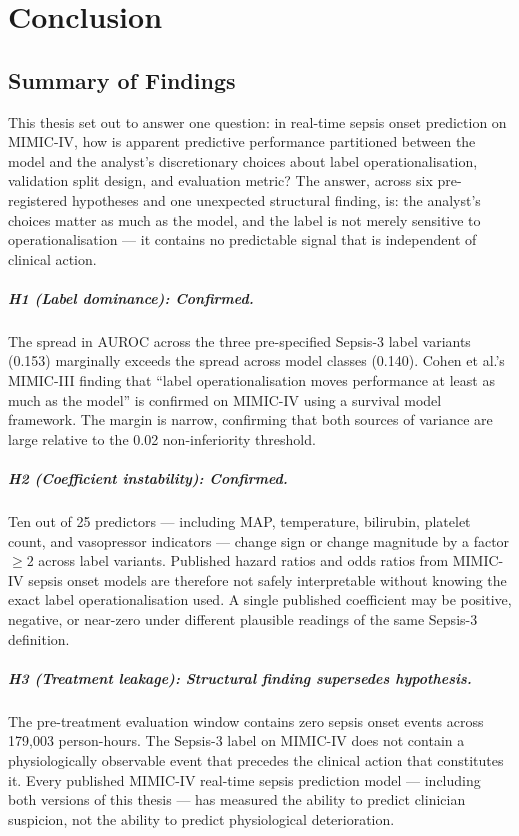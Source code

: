 \chapter{Conclusion}
\label{ch:conclusion}

\section{Summary of Findings}

This thesis set out to answer one question: in real-time sepsis onset prediction
on MIMIC-IV, how is apparent predictive performance partitioned between the model
and the analyst's discretionary choices about label operationalisation, validation
split design, and evaluation metric? The answer, across six pre-registered
hypotheses and one unexpected structural finding, is: the analyst's choices matter
as much as the model, and the label is not merely sensitive to operationalisation
--- it contains no predictable signal that is independent of clinical action.

\paragraph{H1 (Label dominance): Confirmed.}
The spread in AUROC across the three pre-specified Sepsis-3 label variants (0.153)
marginally exceeds the spread across model classes (0.140). Cohen et al.'s
\parencite{cohen2024subtle} MIMIC-III finding that ``label operationalisation
moves performance at least as much as the model'' is confirmed on MIMIC-IV using
a survival model framework. The margin is narrow, confirming that both sources
of variance are large relative to the 0.02 non-inferiority threshold.

\paragraph{H2 (Coefficient instability): Confirmed.}
Ten out of 25 predictors --- including MAP, temperature, bilirubin, platelet count,
and vasopressor indicators --- change sign or change magnitude by a factor
$\geq 2$ across label variants. Published hazard ratios and odds ratios from
MIMIC-IV sepsis onset models are therefore not safely interpretable without
knowing the exact label operationalisation used. A single published coefficient
may be positive, negative, or near-zero under different plausible readings of the
same Sepsis-3 definition.

\paragraph{H3 (Treatment leakage): Structural finding supersedes hypothesis.}
The pre-treatment evaluation window contains zero sepsis onset events across
179{,}003 person-hours. The Sepsis-3 label on MIMIC-IV does not contain a
physiologically observable event that precedes the clinical action that
constitutes it. Every published MIMIC-IV real-time sepsis prediction model ---
including both versions of this thesis --- has measured the ability to predict
clinician suspicion, not the ability to predict physiological deterioration.

